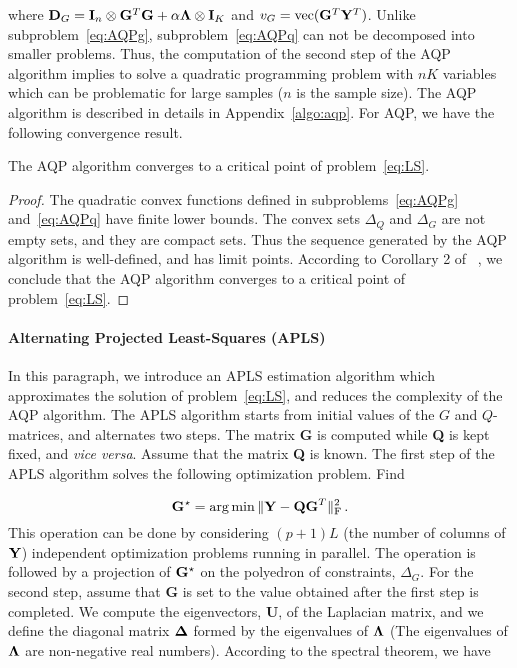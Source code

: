 \noindent where ${\bf D}_G = {\bf I}_{n} \otimes {\bf G}^T {\bf G } + \alpha {\bf \Lambda}  \otimes {\bf I}_K$ and $v_G = {\rm vec}({\bf G}^T{\bf  Y}^T)$. Unlike subproblem~\eqref{eq:AQPg}, subproblem~\eqref{eq:AQPq} can not be decomposed into smaller problems. Thus, the computation of the second step of the AQP algorithm implies to solve a quadratic programming problem with $nK$ variables which can be problematic for large samples ($n$ is the sample size). 
The AQP algorithm is described in details in Appendix~\ref{algo:aqp}. For AQP, we have the following convergence result.
\begin{thm}
\label{th}
	The AQP algorithm converges to a critical point of problem~\eqref{eq:LS}.
\end{thm}
\begin{proof}
The quadratic convex functions defined in subproblems~\eqref{eq:AQPg} and~\eqref{eq:AQPq} have finite lower bounds. The convex sets $\Delta_Q$ and $\Delta_G$ are not empty sets, and they are compact sets. Thus the sequence generated by the AQP algorithm is well-defined, and has limit points.
According to Corollary 2 of ~\cite{Grippo2000}, we conclude that
the AQP algorithm converges to a critical point of problem~\eqref{eq:LS}.
\end{proof}

\paragraph{Alternating Projected Least-Squares (APLS)} In this paragraph, we introduce an APLS estimation algorithm which approximates the solution of problem~\eqref{eq:LS}, and reduces the complexity of the AQP algorithm. The APLS algorithm starts from initial values of the $G$ and $Q$-matrices, and alternates two steps. The matrix {\bf G} is computed  while  {\bf Q} is kept fixed, and {\it vice versa}. Assume that the matrix {\bf Q} is known. The first step of the APLS algorithm solves the following optimization problem. Find 

\begin{equation}
{\bf G}^\star = \arg \min  \|  {\bf Y} - {\bf QG}^T \|^2_{\rm F} \, .
\end{equation}
This operation can be done by considering $(p+1)L$ (the number of columns of ${\bf Y}$) independent optimization problems running in parallel. The operation is followed by a projection of ${\bf G}^\star$ on the polyedron of constraints, $\Delta_G$. For the second step, assume that {\bf G} is set to the value obtained after the first step is completed. We compute the eigenvectors, {\bf U}, of the Laplacian matrix, and we define the diagonal matrix ${\bf \Delta}$ formed by the eigenvalues of ${\bf \Lambda}$ (The eigenvalues of ${\bf \Lambda}$ are non-negative real numbers). According to the spectral theorem, we have

